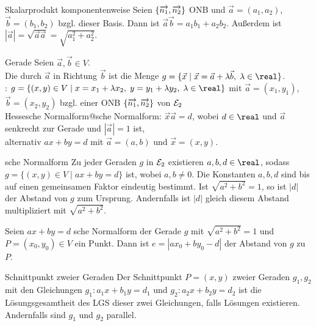 \begin{Lemma}{Skalarprodukt komponentenweise}
    Seien $\{\overrightarrow{n_1}, \overrightarrow{n_2}\}$ ONB und $\vec{a} = (a_1, a_2)$,
    $\vec{b} = (b_1, b_2)$ bzgl. dieser Basis.
    Dann ist $\vec{a} \vec{b} = a_1 b_1 + a_2 b_2$.
    Außerdem ist
    $|\vec{a}| = \sqrt{\vec{a} \vec{a}} = \sqrt{a_1^2 + a_2^2}$.
\end{Lemma}

\begin{Def}{Gerade}
    Seien $\vec{a}, \vec{b} \in V$. \\
    Die  durch $\vec{a}$ in Richtung $\vec{b}$ ist die Menge
    $g = \{\vec{x} \;|\; \vec{x} = \vec{a} + \lambda \vec{b},\;
    \lambda \in \real\}$. \\
    :
    $g = \{(x, y) \in V \;|\; x = x_1 + \lambda x_2,\; y = y_1 + \lambda y_2,\;
    \lambda \in \real\}$ mit $\vec{a} = (x_1, y_1)$, $\vec{b} = (x_2, y_2)$
    bzgl. einer ONB $\{\overrightarrow{n_1}, \overrightarrow{n_2}\}$ von $\mathcal{E}_2$ \\
    {Hessesche Normalform@sche Normalform}:
    $\vec{x} \vec{a} = d$, wobei $d \in \real$ und $\vec{a}$ senkrecht zur
    Gerade und $|\vec{a}| = 1$ ist, \\
    alternativ $ax + by = d$ mit $\vec{a} = (a, b)$ und $\vec{x} = (x, y)$.
\end{Def}

\begin{Satz}{sche Normalform}
    Zu jeder Geraden $g$ in $\mathcal{E}_2$ existieren $a, b, d \in \real$,
    sodass \\
    $g = \{(x, y) \in V \;|\; ax + by = d\}$ ist, wobei $a, b \not= 0$.
    Die Konstanten $a, b, d$ sind bis auf einen gemeinsamen Faktor eindeutig
    bestimmt.
    Ist $\sqrt{a^2 + b^2} = 1$, so ist $|d|$ der Abstand von $g$ zum Ursprung.
    Andernfalls ist $|d|$ gleich diesem Abstand multipliziert
    mit $\sqrt{a^2 + b^2}$.
\end{Satz}

\begin{Kor}
    Seien $ax + by = d$ sche Normalform der Gerade $g$ mit
    $\sqrt{a^2 + b^2} = 1$ und $P = (x_0, y_0) \in V$ ein Punkt.
    Dann ist $e = |ax_0 + by_0 - d|$ der Abstand von $g$ zu $P$.
\end{Kor}

\begin{Satz}{Schnittpunkt zweier Geraden}
    Der Schnittpunkt $P = (x, y)$ zweier Geraden $g_1, g_2$ mit den Gleichungen
    $g_1: a_1 x + b_1 y = d_1$ und $g_2: a_2 x + b_2 y = d_2$ ist
    die Lösungsgesamtheit des LGS dieser zwei Gleichungen, falls Lösungen
    existieren.
    Andernfalls sind $g_1$ und $g_2$ parallel.
\end{Satz}

